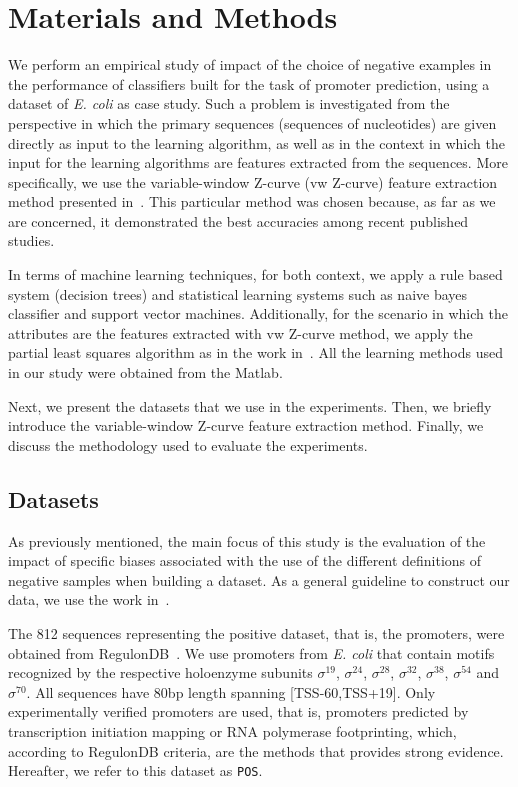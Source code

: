 \documentclass[conference]{IEEEtran}
\begin{document}
\section{Materials and Methods}

We perform an empirical study of impact of the choice of negative examples in the performance of classifiers built for the task of promoter prediction, using a dataset of {\it E. coli} as case study. Such a problem is investigated from the perspective in which the primary sequences (sequences of nucleotides) are given directly as input to the learning algorithm, as well as in the context in which the input for the learning algorithms are features extracted from the sequences. More specifically, we use the variable-window Z-curve (vw Z-curve) feature extraction method presented in~\cite{song2011a}. This particular method was chosen because, as far as we are concerned, it demonstrated the best accuracies among recent published studies.

In terms of machine learning techniques, for both context, we apply a rule based system (decision trees) and statistical learning systems such as naive bayes classifier and support vector machines. Additionally, for the scenario in which the attributes are the features extracted with vw Z-curve method, we apply the partial least squares algorithm as in the work in~\cite{song2011a}. All the learning methods used in our study were obtained from the Matlab.

Next, we present the datasets that we use in the experiments. Then, we briefly introduce the variable-window Z-curve feature extraction method. Finally, we discuss the methodology used to evaluate the experiments.

\subsection{Datasets}

As previously mentioned, the main focus of this study is the evaluation of the impact of specific biases associated with the use of the different definitions  of negative samples when building a dataset. As a general guideline to construct our data, we use the work in~\cite{gordon2003}.

The 812 sequences representing the positive dataset, that is, the promoters, were obtained from RegulonDB~\cite{gama2011}. We use promoters from {\it E. coli} that contain motifs recognized by the respective holoenzyme subunits ${\sigma }^{{19}}$, ${\sigma }^{{24}}$, ${\sigma }^{{28}}$, ${\sigma }^{{32}}$, ${\sigma }^{{38}}$, ${\sigma }^{{54}}$ and ${\sigma }^{{70}}$. All sequences have 80bp length spanning [TSS-60,TSS+19]. Only experimentally verified promoters are used, that is, promoters predicted by transcription initiation mapping or RNA polymerase footprinting, which, according to RegulonDB criteria, are the methods that provides strong evidence. Hereafter, we refer to this dataset as {\tt POS}.
\end{document}
